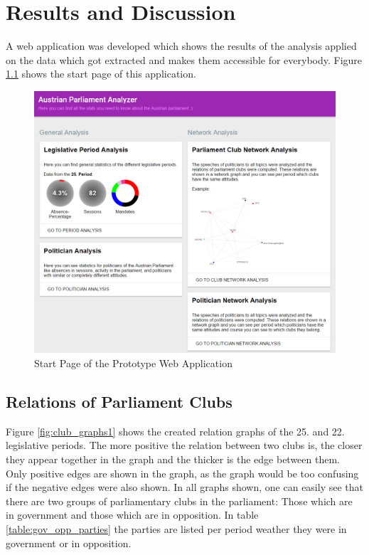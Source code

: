 \chapter{Results and Discussion}
\label{chap:evaluation}

A web application was developed which shows the results of the analysis applied on the data which got extracted and makes them accessible for everybody. Figure \ref{fig:start_page_prototype} shows the start page of this application.

\begin{figure}[h]
	\includegraphics[width=\textwidth]{imgs/result_start_page}
	\caption{Start Page of the Prototype Web Application}
	\label{fig:start_page_prototype}
\end{figure}

\section{Relations of Parliament Clubs}
\label{sec:relations_clubs}
Figure \ref{fig:club_graphs1} shows the created relation graphs of the 25. and 22. legislative periods. The more positive the relation between two clubs is, the closer they appear together in the graph and the thicker is the edge between them. Only positive edges are shown in the graph, as the graph would be too confusing if the negative edges were also shown. In all graphs shown, one can easily see that there are two groups of parliamentary clubs in the parliament: Those which are in government and those which are in opposition. In table \ref{table:gov_opp_parties} the parties are listed per period weather they were in government or in opposition.

